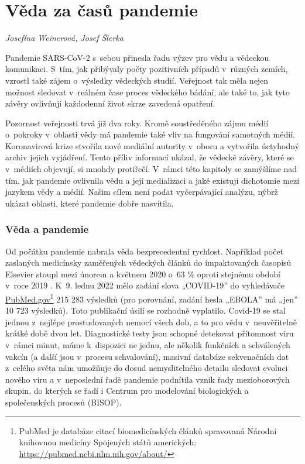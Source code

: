 \chapter{V\v{e}da za \v{c}as\r{u} pandemie}
\label{Veda_pandemie}

\textit{Josefína Weinerová, Josef Šlerka}

\vspace{15mm}


Pandemie SARS-CoV-2 s~sebou přinesla řadu výzev pro vědu a vědeckou komunikaci. S~tím, jak přibývaly počty pozitivních případů v~různých zemích, vzrostl také zájem o~výsledky vědeckých studií. Veřejnost tak měla nejen možnost sledovat v~reálném čase proces vědeckého bádání, ale také to, jak tyto závěry ovlivňují každodenní život skrze zavedená opatření.

Pozornost veřejnosti trvá již dva roky. Kromě soustředěného zájmu médií o~pokroky v~oblasti vědy má pandemie také vliv na fungování samotných médií. Koronavirová krize stvořila nové mediální autority v~oboru a vytvořila úctyhodný archiv jejich vyjádření. Tento příliv informací ukázal, že vědecké závěry, které se v~médiích objevují, si mnohdy protiřečí. V~rámci této kapitoly se zamýšlíme nad tím, jak pandemie ovlivnila vědu a její medializaci a jaké existují dichotomie mezi jazykem vědy a médií. Našim cílem není podat vyčerpávající analýzu, nýbrž ukázat oblasti, které pandemie dobře nasvítila.

\subsection*{Věda a pandemie}

Od počátku pandemie nabrala věda bezprecedentní rychlost. Například počet zaslaných medicínsky zaměřených vědeckých článků do impaktovaných časopisů Elsevier stoupl mezi únorem a květnem 2020 o~63 \% oproti stejnému období v~roce 2019 \cite{Squazzoni2021}. K~9. lednu 2022 mělo zadání slova „COVID-19” do vyhledávače \url{PubMed.gov}\footnote{PubMed je databáze citací biomedicínských článků spravovaná Národní knihovnou medicíny Spojených států amerických: \url{https://pubmed.ncbi.nlm.nih.gov/about/}} 215 283 výsledků (pro porovnání, zadání hesla „EBOLA” má „jen” 10 723 výsledků).
Toto publikační úsilí se rozhodně vyplatilo. Covid-19 se stal jednou z~nejlépe prostudovaných nemocí všech dob, a to pro vědu v~neuvěřitelně krátké době dvou let. Diagnostické testy jsou schopné detekovat přítomnost viru v~rámci minut, máme k~dispozici ne jednu, ale několik funkčních a schválených vakcín (a další jsou v~procesu schvalování), masivní databáze sekvenačních dat z~celého světa nám umožňuje do dosud nemyslitelného detailu sledovat evoluci nového viru \cite{Maxmen2021} a v~neposlední řadě pandemie podnítila vznik řady mezioborových skupin, do kterých se řadí i Centrum pro modelování biologických a společenských procesů (BISOP).

